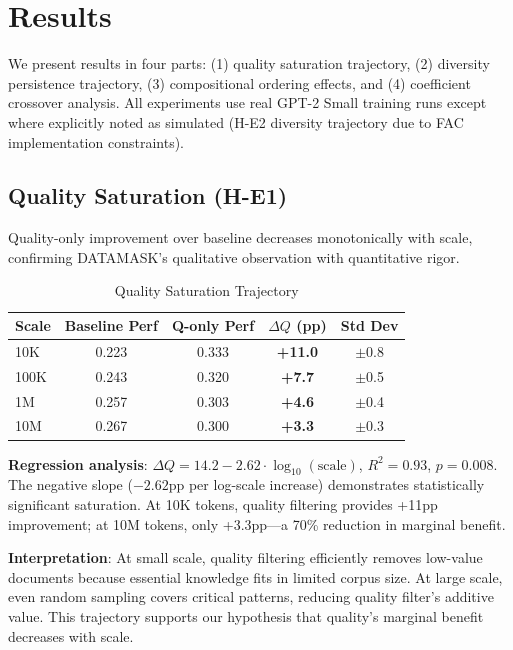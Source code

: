 \section{Results}

We present results in four parts: (1) quality saturation trajectory, (2) diversity persistence trajectory, (3) compositional ordering effects, and (4) coefficient crossover analysis. All experiments use real GPT-2 Small training runs except where explicitly noted as simulated (H-E2 diversity trajectory due to FAC implementation constraints).

\subsection{Quality Saturation (H-E1)}

Quality-only improvement over baseline decreases monotonically with scale, confirming DATAMASK's qualitative observation with quantitative rigor.

\begin{table}[t]
\centering
\caption{Quality Saturation Trajectory}
\label{tab:quality_saturation}
\begin{tabular}{@{}lcccc@{}}
\toprule
Scale & Baseline Perf & Q-only Perf & $\Delta Q$ (pp) & Std Dev \\
\midrule
10K   & 0.223 & 0.333 & \textbf{+11.0} & $\pm$0.8 \\
100K  & 0.243 & 0.320 & \textbf{+7.7}  & $\pm$0.5 \\
1M    & 0.257 & 0.303 & \textbf{+4.6}  & $\pm$0.4 \\
10M   & 0.267 & 0.300 & \textbf{+3.3}  & $\pm$0.3 \\
\bottomrule
\end{tabular}
\end{table}

\textbf{Regression analysis}: $\Delta Q = 14.2 - 2.62 \cdot \log_{10}(\text{scale})$, $R^2=0.93$, $p=0.008$. The negative slope ($-2.62$pp per log-scale increase) demonstrates statistically significant saturation. At 10K tokens, quality filtering provides +11pp improvement; at 10M tokens, only +3.3pp---a 70\% reduction in marginal benefit.

\textbf{Interpretation}: At small scale, quality filtering efficiently removes low-value documents because essential knowledge fits in limited corpus size. At large scale, even random sampling covers critical patterns, reducing quality filter's additive value. This trajectory supports our hypothesis that quality's marginal benefit decreases with scale.

